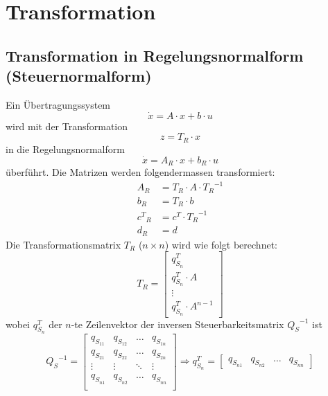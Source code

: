 



\section{Transformation}
\subsection{Transformation in Regelungsnormalform (Steuernormalform)}
Ein Übertragungssystem 
\[ \dot{x}=A\cdot x +  b \cdot u \]
wird mit der Transformation
\[ z=T_R\cdot x \]
in die Regelungsnormalform
\[ \dot{x}=A_R\cdot x +  b_R \cdot u \]
überführt. Die Matrizen werden folgendermassen transformiert:
\[\begin{aligned}
	A_R &= T_R\cdot A \cdot {T_R}^{-1}	\\
	b_R &= T_R\cdot b	\\	
	{c^T}_R &= c^T\cdot {T_R}^{-1}	\\	
	d_R &= d
\end{aligned}\]
Die Transformationsmatrix $T_R$ ($n\times n$) wird wie folgt berechnet:
\[ \renewcommand\arraystretch{1.3}
	T_R= \begin{bmatrix}
		q_{S_n}^T \\
		q_{S_n}^T \cdot A \\
		\vdots \\
		q_{S_n}^T \cdot A^{n-1}	
	\end{bmatrix}
\]
wobei $q_{S_n}^T$ der $n$-te Zeilenvektor der inversen Steuerbarkeitsmatrix ${Q_S}^{-1}$ ist
\[
	{Q_S}^{-1} = \begin{bmatrix}
		q_{S_{11}} & q_{S_{12}} & \ldots & q_{S_{1n}}\\
		q_{S_{21}} & q_{S_{22}} & \ldots & q_{S_{2n}}\\
		\vdots		& \vdots	 & \ddots & \vdots\\
		q_{S_{n1}} & q_{S_{n2}} & \ldots & q_{S_{nn}}\\	 
	\end{bmatrix} \Rightarrow
	q_{S_n}^T=
	\begin{bmatrix}
		q_{S_{n1}} & q_{S_{n2}} & \ldots &	q_{S_{nn}}
	\end{bmatrix}	
\]

